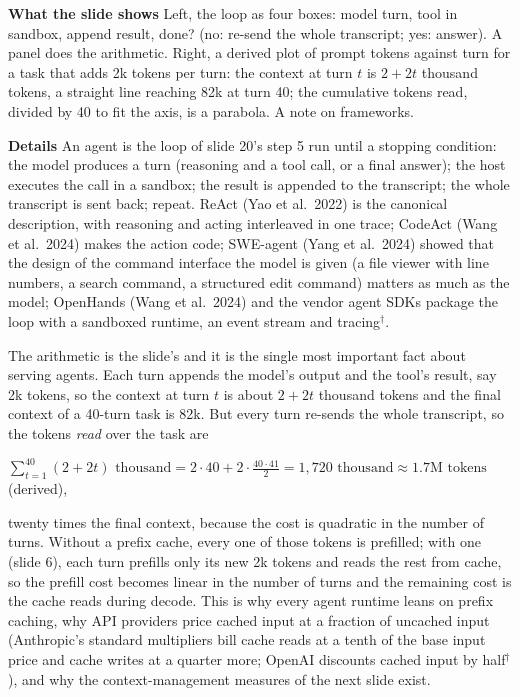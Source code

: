 \documentclass[11pt,letterpaper]{article}
\newcommand{\para}[1]{\medskip\noindent\textbf{#1}\quad}
\newenvironment{formulas}{\begin{tcolorbox}[formulabox]}{\end{tcolorbox}}
\begin{document}
\para{What the slide shows} Left, the loop as four boxes: model turn, tool in sandbox, append result, done? (no: re-send the whole transcript; yes: answer). A panel does the arithmetic. Right, a derived plot of prompt tokens against turn for a task that adds 2k tokens per turn: the context at turn $t$ is $2+2t$ thousand tokens, a straight line reaching 82k at turn 40; the cumulative tokens read, divided by 40 to fit the axis, is a parabola. A note on frameworks.

\para{Details} An agent is the loop of slide 20's step 5 run until a stopping condition: the model produces a turn (reasoning and a tool call, or a final answer); the host executes the call in a sandbox; the result is appended to the transcript; the whole transcript is sent back; repeat. ReAct (Yao et al.\ 2022) is the canonical description, with reasoning and acting interleaved in one trace; CodeAct (Wang et al.\ 2024) makes the action code; SWE-agent (Yang et al.\ 2024) showed that the design of the command interface the model is given (a file viewer with line numbers, a search command, a structured edit command) matters as much as the model; OpenHands (Wang et al.\ 2024) and the vendor agent SDKs package the loop with a sandboxed runtime, an event stream and tracing$^\dagger$.

The arithmetic is the slide's and it is the single most important fact about serving agents. Each turn appends the model's output and the tool's result, say 2k tokens, so the context at turn $t$ is about $2+2t$ thousand tokens and the final context of a 40-turn task is 82k. But every turn re-sends the whole transcript, so the tokens \emph{read} over the task are
\begin{formulas}
$\displaystyle\sum_{t=1}^{40}(2+2t)\text{ thousand}=2\cdot40+2\cdot\frac{40\cdot41}{2}=1{,}720\text{ thousand}\approx1.7\text{M tokens}$ (derived),
\end{formulas}
twenty times the final context, because the cost is quadratic in the number of turns. Without a prefix cache, every one of those tokens is prefilled; with one (slide 6), each turn prefills only its new 2k tokens and reads the rest from cache, so the prefill cost becomes linear in the number of turns and the remaining cost is the cache reads during decode. This is why every agent runtime leans on prefix caching, why API providers price cached input at a fraction of uncached input (Anthropic's standard multipliers bill cache reads at a tenth of the base input price and cache writes at a quarter more; OpenAI discounts cached input by half$^\dagger$), and why the context-management measures of the next slide exist.
\end{document}
